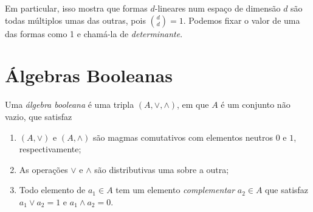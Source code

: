 Em particular, isso mostra que formas $d$-lineares num espaço de dimensão $d$ são todas múltiplos umas das outras, pois $\binom{d}{d}=1$. Podemos fixar o valor de uma das formas como 1 e chamá-la de \emph{determinante}.

















\chapter{Álgebras Booleanas}

\begin{defi}
Uma \emph{álgebra booleana} é uma tripla $(A, \vee ,\wedge)$, em que $A$ é um conjunto não vazio, que satisfaz
	\begin{enumerate}
	\item $(A, \vee )$ e $(A,\wedge)$ são magmas comutativos com elementos neutros $0$ e $1$, respectivamente;
	\item As operações $ \vee $ e $\wedge$ são distributivas uma sobre a outra;
	\item Todo elemento de $a_1 \in A$ tem um elemento \emph{complementar} $a_2 \in A$ que satisfaz $a_1 \vee a_2=1$ e $a_1 \wedge a_2 = 0$.
	\end{enumerate}
\end{defi}

